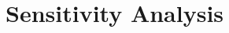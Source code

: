 \documentclass{beamer}
\def\blue{\color{blue}}
\begin{document}

\section{Sensitivity Analysis}
\end{document}

